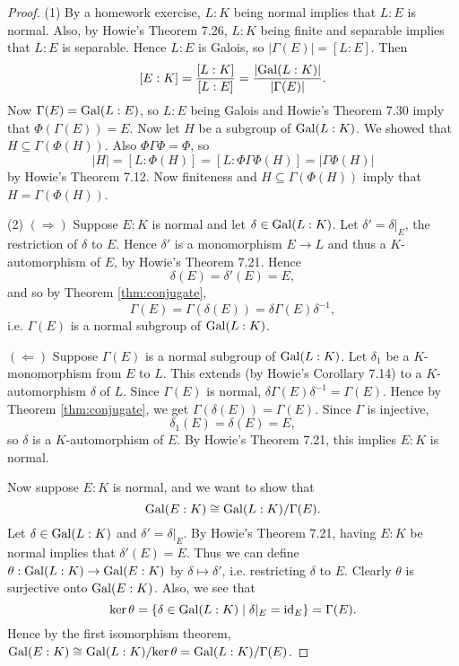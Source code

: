 \begin{proof}
  (1) By a homework exercise, $L : K$ being normal implies
  that $L : E$ is normal. Also, by Howie's
  Theorem 7.26, $L : K$ being finite and separable
  implies that $L : E$ is separable. Hence $L : E$ is
  Galois, so $|\Gamma(E)| = [L : E]$. Then
  \[
    [E : K] = \frac{[L : K]}{[L : E]}
    = \frac{|{\operatorname{Gal}(L : K)}|}{|\Gamma(E)|}.
  \]
  Now $\Gamma(E) = \operatorname{Gal}(L : E)$, so $L : E$ being
  Galois and Howie's Theorem 7.30 imply that
  $\Phi(\Gamma(E)) = E$. Now let $H$ be a subgroup of
  $\operatorname{Gal}(L : K)$. We showed that
  $H \subseteq \Gamma(\Phi(H))$. Also $\Phi\Gamma\Phi = \Phi$,
  so
  \[
    |H| = [L : \Phi(H)] = [L : \Phi\Gamma\Phi(H)]
    = |\Gamma\Phi(H)|
  \]
  by Howie's Theorem 7.12. Now finiteness and
  $H \subseteq \Gamma(\Phi(H))$ imply that
  $H = \Gamma(\Phi(H))$.

  (2) $(\Rightarrow)$ Suppose $E : K$ is normal and
  let $\delta \in \operatorname{Gal}(L : K)$. Let
  $\delta' = \delta|_E$, the restriction of $\delta$ to
  $E$. Hence $\delta'$ is a monomorphism $E \to L$
  and thus a $K$-automorphism of $E$, by Howie's
  Theorem 7.21. Hence
  \[
    \delta(E) = \delta'(E) = E,
  \]
  and so by Theorem \ref{thm:conjugate},
  \[
    \Gamma(E) = \Gamma(\delta(E)) = \delta \Gamma(E) \delta^{-1},
  \]
  i.e. $\Gamma(E)$ is a normal subgroup of
  $\operatorname{Gal}(L : K)$.

  $(\Leftarrow)$ Suppose $\Gamma(E)$ is a normal
  subgroup of $\operatorname{Gal}(L : K)$. Let $\delta_1$ be
  a $K$-monomorphism from $E$ to $L$. This
  extends (by Howie's Corollary 7.14) to a
  $K$-automorphism $\delta$ of $L$. Since
  $\Gamma(E)$ is normal, $\delta \Gamma(E) \delta^{-1} = \Gamma(E)$.
  Hence by Theorem \ref{thm:conjugate}, we get
  $\Gamma(\delta(E)) = \Gamma(E)$. Since $\Gamma$ is
  injective,
  \[
    \delta_1(E) = \delta(E) = E,
  \]
  so $\delta$ is a $K$-automorphism of $E$. By Howie's
  Theorem 7.21, this implies $E : K$ is normal.

  Now suppose $E : K$ is normal, and we want to show
  that
  \[\operatorname{Gal}(E : K) \cong \operatorname{Gal}(L : K) / \Gamma(E).\]
  Let $\delta \in \operatorname{Gal}(L : K)$ and $\delta' = \delta|_E$.
  By Howie's Theorem 7.21, having $E : K$ be normal
  implies that $\delta'(E) = E$.
  Thus we can define
  $\theta : \operatorname{Gal}(L : K) \to \operatorname{Gal}(E : K)$ by
  $\delta \mapsto \delta'$, i.e. restricting
  $\delta$ to $E$. Clearly $\theta$ is surjective
  onto $\operatorname{Gal}(E : K)$. Also, we see that
  \[
    \ker \theta = \{\delta \in \operatorname{Gal}(L : K) \mid \delta|_E = \mathrm{id}_E\} = \Gamma(E).
  \]
  Hence by the first isomorphism theorem,
  $\operatorname{Gal}(E : K) \cong \operatorname{Gal}(L : K) / {\ker \theta} = \operatorname{Gal}(L : K) / \Gamma(E)$.
\end{proof}

